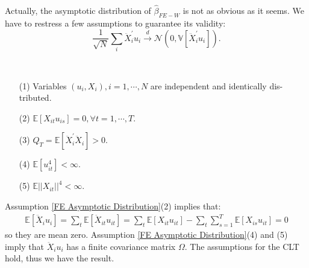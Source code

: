 \begin{remark}
    \

    Actually, the asymptotic distribution of $\hat{\beta}_{FE-W}$ is not as obvious as it seems.
    We have to restress a few assumptions to guarantee its validity:
    \[
    \frac{1}{\sqrt{N}} \sum_{i} \ddot{X}_i^{\prime} u_i \overset{d}{\rightarrow} \mathcal{N}(0, \mathbb{V}[\ddot{X}_i^{\prime} u_i]).
    \]
    \begin{assumption}\label{FE Asymptotic Distribution}
        \

        \begin{enumerate}
            \item[(1)] Variables $(u_i, X_i), i=1, \cdots, N$ are independent and identically dis-
            tributed.
            \item[(2)] $\mathbb{E}[X_{it} u_{is}] = 0, \forall t=1, \cdots, T.$
            \item[(3)] $Q_T = \mathbb{E}[\ddot{X}_i^{\prime} \ddot{X}_i] > 0.$
            \item[(4)] $\mathbb{E}[u_{it}^4] < \infty.$
            \item[(5)] $\mathbb{E} \vert | X_{it} | \vert^4 < \infty.$
        \end{enumerate} 
    \end{assumption}
    Assumption \ref{FE Asymptotic Distribution}(2) implies that:
    \begin{gather*}
        \mathbb{E}[\ddot{X}_i u_i] = \sum_{t} \mathbb{E}[\ddot{X}_{it} u_{it}] = \sum_{t} \mathbb{E}[X_{it} u_{it}] - \sum_{t} \sum_{s=1}^T \mathbb{E}[X_{is} u_{it}] = 0
    \end{gather*}
    so they are mean zero.
    Assumption \ref{FE Asymptotic Distribution}(4) and (5) imply that $\ddot{X}_i u_i$ has a finite covariance matrix $\Omega.$
    The assumptions for the CLT hold, thus we have the result.
\end{remark}

